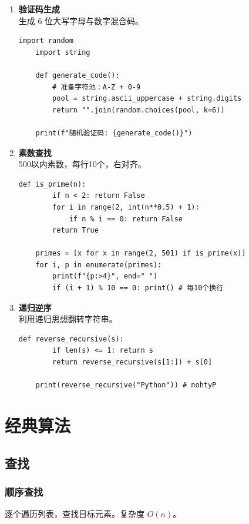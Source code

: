 \documentclass{article}
\begin{document}
\begin{enumerate}[label=\arabic*、, leftmargin=1.5cm]
    \item \textbf{验证码生成} \\
    生成 6 位大写字母与数字混合码。
    \begin{lstlisting}[caption= 验证码生成代码]
    import random
    import string

    def generate_code():
        # 准备字符池：A-Z + 0-9
        pool = string.ascii_uppercase + string.digits
        return "".join(random.choices(pool, k=6))

    print(f"随机验证码: {generate_code()}")
    \end{lstlisting}

    \item \textbf{素数查找} \\
    500以内素数，每行10个，右对齐。
    \begin{lstlisting}[caption=素数查找代码]
    def is_prime(n):
        if n < 2: return False
        for i in range(2, int(n**0.5) + 1):
            if n % i == 0: return False
        return True

    primes = [x for x in range(2, 501) if is_prime(x)]
    for i, p in enumerate(primes):
        print(f"{p:>4}", end=" ")
        if (i + 1) % 10 == 0: print() # 每10个换行
    \end{lstlisting}

    \item \textbf{递归逆序} \\
    利用递归思想翻转字符串。
    \begin{lstlisting}[caption=递归逆序代码]
    def reverse_recursive(s):
        if len(s) <= 1: return s
        return reverse_recursive(s[1:]) + s[0]

    print(reverse_recursive("Python")) # nohtyP
    \end{lstlisting}

\end{enumerate}

\section{经典算法}
\subsection{查找}
\subsubsection{顺序查找}
逐个遍历列表，查找目标元素。复杂度 $O(n)$。
\end{document}
